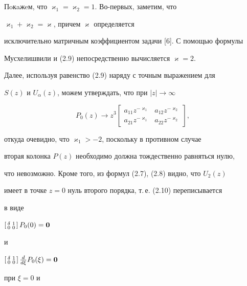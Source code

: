 \begin{pf} 


Пoкaжeм, что $\varkappa_1=\varkappa_2=1$. Во-первых, заметим, что 


$\varkappa_1+\varkappa_2=\varkappa$, причем $\varkappa$ определяется 


исключительно матричным коэффициентом задачи [6]. С помощью формулы 


Мусхелишвили и (2.9) непосредственно вычисляется $\varkappa=2$. 


 


Далее, используя равенство (2.9) наряду с точным выражением для 


$S(z)$ и $U_\alpha(z)$, можем утверждать, что при $|z|\to\infty$ 


$$ 


P_0(z)\to z^3 


\begin{bmatrix} 


a_{11}z^{-\varkappa_1} & a_{12}z^{-\varkappa_2} \\ 


a_{21}z^{-\varkappa_1} & a_{22}z^{-\varkappa_2} 


\end{bmatrix}, 


$$ 


откуда очевидно, что $\varkappa_1>-2$, поскольку в противном случае 


вторая колонка $P(z)$ необходимо должна тождественно равняться нулю, 


что невозможно. Кроме того, из формул (2.7), (2.8) видно, что $U_2(z)$ 


имеет в точке $z=0$ нуль второго порядка, т.\,е. (2.10) переписывается 


в виде 


$\left[\begin{smallmatrix}\delta & 1 \\ 0 & 0 \end{smallmatrix}\right] 


P_0(0)=\bold 0$ 


и 


$\left[\begin{smallmatrix}\delta & 1 \\ 0 & 0 \end{smallmatrix}\right] 


\frac{d}{d\xi}P_0(\xi)=\bold 0$ 


при $\xi=0$ и 



\end{pf}
